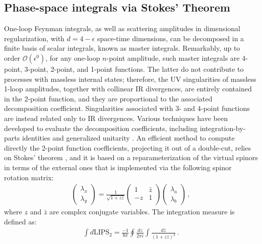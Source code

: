\subsection{Phase-space integrals via Stokes' Theorem}
\label{sec:phasespace_Stokes}
%
One-loop Feynman integrals, as well as scattering amplitudes in dimensional regularization, with $d= 4- \epsilon $ space-time dimensions,  can be decomposed in a finite basis of scalar integrals, known as master integrals.
Remarkably, up to order $\mathcal{O}(\epsilon^0)$, for any one-loop $n$-point amplitude, such master integrals are 4-point, 3-point, 2-point, and 1-point functions.
The latter do not contribute to processes with massless internal states; therefore, the UV singularities of massless 1-loop amplitudes,
together with collinear IR divergences,
are entirely contained in the 2-point function, and
they are proportional to the associated decomposition coefficient.
Singularities associated with 3- and 4-point functions are instead related only to IR divergences. 
Various techniques have been developed to evaluate the decomposition coefficients, including integration-by-parts identities \cite{Tkachov:1981wb,Chetyrkin:1981qh,Laporta:2000dsw} and generalized unitarity \cite{Bern:1994zx,Bern:1995db,Britto:2004nc,Britto:2006sj,Anastasiou:2006gt,Ossola:2006us}.
%
An efficient method to compute directly the 2-point function coefficients, projecting it out of a double-cut, relies on Stokes' theorem \cite{Mastrolia:2009dr}, and it is based on a reparameterization of the virtual spinors in terms of the external ones that is implemented via the following spinor rotation matrix:
\begin{eqnarray}
    \begin{pmatrix}
 \lambda_x \\
 \lambda_y
    \end{pmatrix}
     =  
   \frac{1}{\sqrt{1+ z \bar{z}}}\left(
\begin{array}{cc}
 1 & \bar{z} \\
 -z & 1 \\
\end{array}
\right)
\begin{pmatrix}
 \lambda_{a} \\
 \lambda_{b}
    \end{pmatrix}\,,
    \label{eq:stokes_par}
\end{eqnarray}
where $z$ and $\bar{z}$ are complex conjugate variables.
%
The integration measure is defined as:
\begin{eqnarray}
    \int d \text{LIPS}_2 = 
    \frac{-1}{8 \pi} 
    \oint \frac{dz}{2\pi i } 
    \int    
    \frac{d{\bar z}}{(1 + z \bar{z})^2} \, . 
\end{eqnarray}

